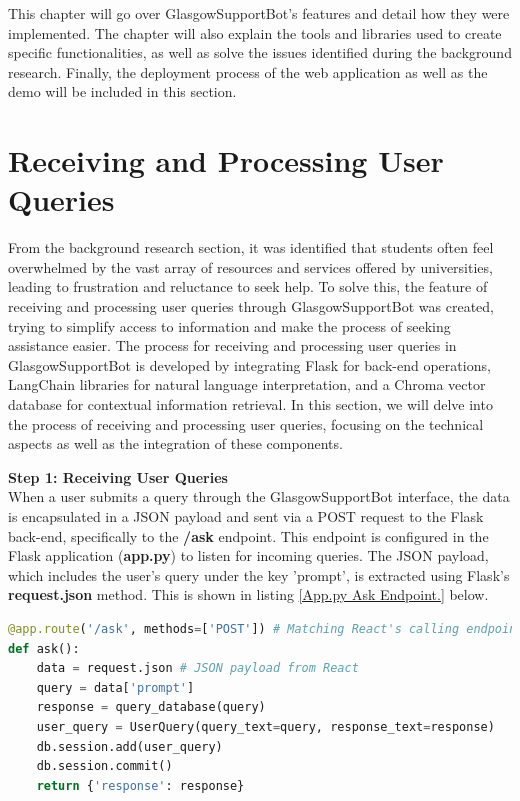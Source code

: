 \documentclass{l4proj}
\begin{document}
This chapter will go over GlasgowSupportBot's features and detail how they were implemented.
The chapter will also explain the tools and libraries used to create specific functionalities, as well as solve the issues identified during the background research. Finally, the
deployment process of the web application as well as the demo will be included in this section.

\section{Receiving and Processing User Queries}

From the background research section, it was identified that students often feel overwhelmed by the vast array of resources and services offered by universities, leading to frustration and reluctance to seek help. To solve this, the feature of receiving and processing user queries through GlasgowSupportBot was created, trying to simplify access to information and make the process of seeking assistance easier.
The process for receiving and processing user queries in GlasgowSupportBot is developed by integrating Flask for back-end operations, LangChain libraries for natural language interpretation, and a Chroma vector database for contextual information retrieval. In this section, we will delve into the process of receiving and processing user queries, focusing on the technical aspects as well as the integration of these components.

\textbf{Step 1: Receiving User Queries}
\\
When a user submits a query through the GlasgowSupportBot interface, the data is encapsulated in a JSON payload and sent via a POST request to the Flask back-end, specifically to the \textbf{/ask} endpoint. This endpoint is configured in the Flask application (\textbf{app.py}) to listen for incoming queries. The JSON payload, which includes the user's query under the key 'prompt', is extracted using Flask's \textbf{request.json} method. This is shown in listing \ref{App.py Ask Endpoint.} below.


\begin{lstlisting}[language=Python, caption={App.py Ask Endpoint.}, label= {App.py Ask Endpoint.}]
@app.route('/ask', methods=['POST']) # Matching React's calling endpoint
def ask():
    data = request.json # JSON payload from React
    query = data['prompt']
    response = query_database(query)
    user_query = UserQuery(query_text=query, response_text=response)
    db.session.add(user_query)
    db.session.commit()
    return {'response': response}
\end{lstlisting}
\end{document}
